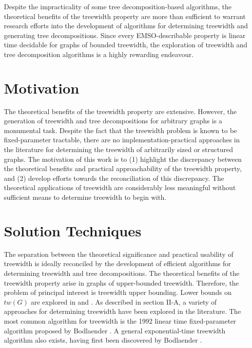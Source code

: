 \documentclass[12pt,conference]{IEEEtran}
\theoremstyle{plain}
\begin{document}
Despite the impracticality of some tree decomposition-based algorithms, the theoretical benefits of the treewidth property are more than sufficient to warrant research efforts into the development of algorithms for determining treewidth and generating tree decompositions. Since every EMSO-describable property is linear time decidable for graphs of bounded treewidth, the exploration of treewidth and tree decomposition algorithms is a highly rewarding endeavour.

\section{Motivation}

The theoretical benefits of the treewidth property are extensive. However, the generation of treewidth and tree decompositions for arbitrary graphs is a monumental task. Despite the fact that the treewidth problem is known to be fixed-parameter tractable, there are no implementation-practical approaches in the literature for determining the treewidth of arbitrarily sized or structured graphs. The motivation of this work is to (1) highlight the discrepancy between the theoretical benefits and practical approachability of the treewidth property, and (2) develop efforts towards the reconciliation of this discrepancy. The theoretical applications of treewidth are considerably less meaningful without sufficient means to determine treewidth to begin with.

\section{Solution Techniques}

The separation between the theoretical significance and practical usability of treewidth is ideally reconciled by the development of efficient algorithms for determining treewidth and tree decompositions. The theoretical benefits of the treewidth property arise in graphs of upper-bounded treewidth. Therefore, the problem of principal interest is treewidth upper bounding. Lower bounds on $tw(G)$ are explored in \cite{treewidth-lowerbounds-1} and \cite{treewidth-lowerbounds-2}. As described in section II-A, a variety of approaches for determining treewidth have been explored in the literature. The most common algorithm for treewidth is the 1992 linear time fixed-parameter algorithm proposed by Bodlaender \cite{bodlaender-1992}. A general exponential-time treewidth algorithm also exists, having first been discovered by Bodlaender \cite{bodlaender-2012}.
\end{document}

